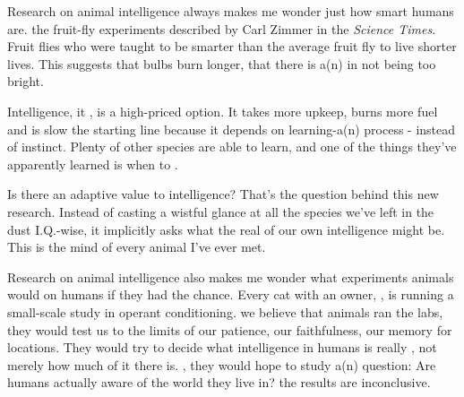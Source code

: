 
\qquad Research on animal intelligence always makes me wonder just how smart humans are. \underline{\quad}   the fruit-fly experiments described by Carl Zimmer in the \emph{Science Times}. Fruit flies who were taught to be smarter than the average fruit fly \underline{\quad}   to live shorter lives. This suggests that \underline{\quad}   bulbs burn longer, that there is a(n) \underline{\quad}     in not being too bright.

\qquad Intelligence, it \underline{\quad}, is a high-priced option. It takes more upkeep, burns more fuel and is slow \underline{\quad}    the starting line because it depends on learning-a(n) \underline{\quad} process - instead of instinct. Plenty of other species are able to learn, and one of the things they've apparently learned is when to \underline{\quad}.

\qquad Is there an adaptive value to \underline{\quad}    intelligence? That's the question behind this new research. Instead of casting a wistful glance \underline{\quad}    at all the species we've left in the dust I.Q.-wise, it implicitly asks what the real \underline{\quad}    of our own intelligence might be. This is \underline{\quad}   the mind of every animal I've ever met.

\qquad Research on animal intelligence also makes me wonder what experiments animals would \underline{\quad}   on humans if they had the chance. Every cat with an owner, \underline{\quad}   , is running a small-scale study in operant conditioning. we believe that \underline{\quad}  animals ran the labs, they would test us to \underline{\quad}   the limits of our patience, our faithfulness, our memory for locations. They would try to decide what intelligence in humans is really \underline{\quad}, not merely how much of it there is.   \underline{\quad}, they would hope to study a(n) \underline{\quad}   question: Are humans actually aware of the world they live in? \underline{\quad}   the results are inconclusive.

\vspace{6pt}


